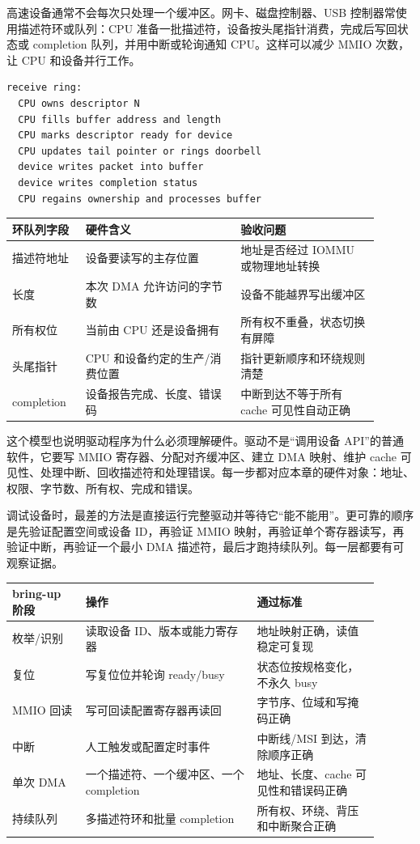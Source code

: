 高速设备通常不会每次只处理一个缓冲区。网卡、磁盘控制器、USB 控制器常使用描述符环或队列：CPU 准备一批描述符，设备按头尾指针消费，完成后写回状态或 completion 队列，并用中断或轮询通知 CPU。这样可以减少 MMIO 次数，让 CPU 和设备并行工作。

\begin{lstlisting}
receive ring:
  CPU owns descriptor N
  CPU fills buffer address and length
  CPU marks descriptor ready for device
  CPU updates tail pointer or rings doorbell
  device writes packet into buffer
  device writes completion status
  CPU regains ownership and processes buffer
\end{lstlisting}

\begin{longtable}{L{0.18\linewidth}L{0.38\linewidth}L{0.34\linewidth}}
\toprule
环队列字段 & 硬件含义 & 验收问题 \\
\midrule
描述符地址 & 设备要读写的主存位置 & 地址是否经过 IOMMU 或物理地址转换 \\
长度 & 本次 DMA 允许访问的字节数 & 设备不能越界写出缓冲区 \\
所有权位 & 当前由 CPU 还是设备拥有 & 所有权不重叠，状态切换有屏障 \\
头尾指针 & CPU 和设备约定的生产/消费位置 & 指针更新顺序和环绕规则清楚 \\
completion & 设备报告完成、长度、错误码 & 中断到达不等于所有 cache 可见性自动正确 \\
\bottomrule
\end{longtable}

这个模型也说明驱动程序为什么必须理解硬件。驱动不是“调用设备 API”的普通软件，它要写 MMIO 寄存器、分配对齐缓冲区、建立 DMA 映射、维护 cache 可见性、处理中断、回收描述符和处理错误。每一步都对应本章的硬件对象：地址、权限、字节数、所有权、完成和错误。

调试设备时，最差的方法是直接运行完整驱动并等待它“能不能用”。更可靠的顺序是先验证配置空间或设备 ID，再验证 MMIO 映射，再验证单个寄存器读写，再验证中断，再验证一个最小 DMA 描述符，最后才跑持续队列。每一层都要有可观察证据。

\begin{longtable}{L{0.18\linewidth}L{0.42\linewidth}L{0.3\linewidth}}
\toprule
bring-up 阶段 & 操作 & 通过标准 \\
\midrule
枚举/识别 & 读取设备 ID、版本或能力寄存器 & 地址映射正确，读值稳定可复现 \\
复位 & 写复位位并轮询 ready/busy & 状态位按规格变化，不永久 busy \\
MMIO 回读 & 写可回读配置寄存器再读回 & 字节序、位域和写掩码正确 \\
中断 & 人工触发或配置定时事件 & 中断线/MSI 到达，清除顺序正确 \\
单次 DMA & 一个描述符、一个缓冲区、一个 completion & 地址、长度、cache 可见性和错误码正确 \\
持续队列 & 多描述符环和批量 completion & 所有权、环绕、背压和中断聚合正确 \\
\bottomrule
\end{longtable}

